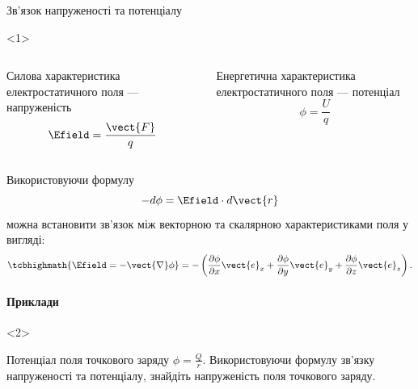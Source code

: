 \documentclass{beamer}
\begin{document}
\begin{frame}{Зв'язок напруженості та потенціалу}{}
	\begin{onlyenv}
		\begin{columns}
			\begin{column}{0.5\linewidth}\small
				\begin{block}{}\centering
					\alert{Силова характеристика} електростатичного поля ---
					напруженість
					\begin{equation*}
						\Efield = \frac{\vect{F}}{q}
					\end{equation*}
				\end{block}
			\end{column}
			\begin{column}{0.5\linewidth}\small
				\begin{block}{}\centering
					\alert{Енергетична характеристика} електростатичного поля ---
					потенціал
					\begin{equation*}
						\phi = \frac{U}{q}
					\end{equation*}
				\end{block}
			\end{column}
		\end{columns}
	\end{onlyenv}
	\begin{block}{}
		Використовуючи формулу
		\begin{equation*}
			-d\phi = \Efield\cdot d\vect{r}
		\end{equation*}
		можна встановити зв'язок між векторною та скалярною характеристиками поля у
		вигляді:
		\begin{equation*}
			\tcbhighmath{\Efield = - \vect{\nabla}\phi }= - \left( \frac{\partial
				\phi}{\partial x}
			\vect{e}_x + \frac{\partial \phi}{\partial y} \vect{e}_y + \frac{\partial
				\phi}{\partial z} \vect{e}_z\right).
		\end{equation*}
	\end{block}

	\framesubtitle<2>{Приклади}
	\begin{onlyenv}
		\begin{exampleblock}{}\justifying
			Потенціал поля точкового заряду $\phi = \frac{Q}{r}$. Використовуючи
			формулу зв'язку напруженості та потенціалу, знайдіть напруженість поля
			точкового заряду.
		\end{exampleblock}

	\end{onlyenv}
\end{frame}
\end{document}
